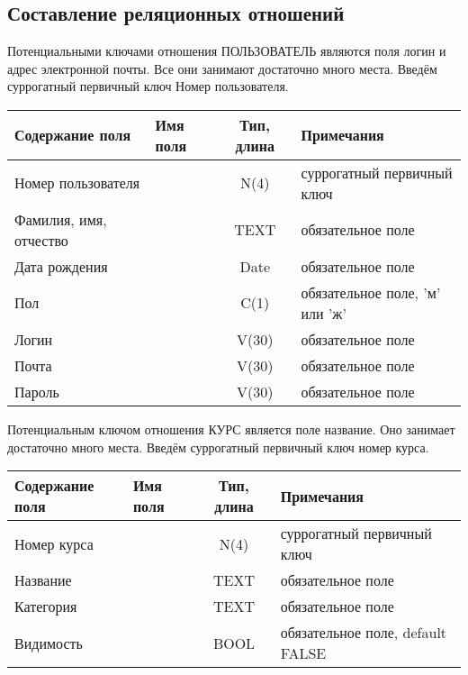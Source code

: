 \documentclass[a4paper,14pt]{article}
\begin{document}
\subsection{Составление реляционных отношений}


Потенциальными ключами отношения ПОЛЬЗОВАТЕЛЬ являются поля логин и адрес электронной почты. Все они занимают достаточно много места. Введём суррогатный первичный ключ Номер пользователя.

\begin{table}[H]
\begin{tabular}{|l|l|c|l|}
	\hline
	Содержание поля        & Имя поля & Тип, длина & Примечания                     \\ \hline
	Номер пользователя     &          &    N(4)    & суррогатный первичный ключ     \\ \hline
	Фамилия, имя, отчество &          &    TEXT    & обязательное поле              \\ \hline
	Дата рождения          &          &    Date    & обязательное поле              \\ \hline
	Пол                    &          &    C(1)    & обязательное поле, 'м' или 'ж' \\ \hline
	Логин                  &          &   V(30)    & обязательное поле              \\ \hline
	Почта                  &          &   V(30)    & обязательное поле              \\ \hline
	Пароль                 &          &   V(30)    & обязательное поле              \\ \hline
\end{tabular}
\end{table}


Потенциальным ключом отношения КУРС является поле название. Оно занимает достаточно много места. Введём суррогатный первичный ключ номер курса.

\begin{table}[H]
	\begin{tabular}{|l|l|c|l|}
		\hline
		Содержание поля & Имя поля & Тип, длина & Примечания                       \\ \hline
		Номер курса     &          &    N(4)    & суррогатный первичный ключ       \\ \hline
		Название        &          &    TEXT    & обязательное поле                \\ \hline
		Категория       &          &    TEXT    & обязательное поле                \\ \hline
		Видимость       &          &    BOOL    & обязательное поле, default FALSE \\ \hline
	\end{tabular}
\end{table}
\end{document}
